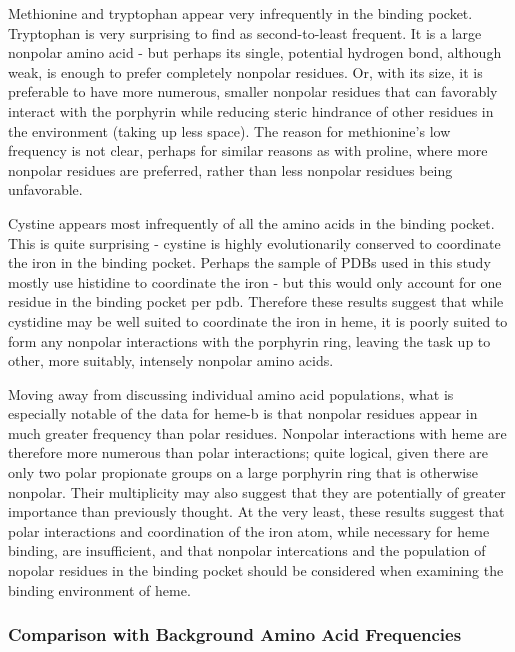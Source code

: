 \documentclass[a4paper, nobind]{templates/ociamthesis}
\begin{document}
Methionine and tryptophan appear very infrequently in the binding pocket. Tryptophan is very surprising to find as second-to-least frequent. It is a large nonpolar amino acid - but perhaps its single, potential hydrogen bond, although weak, is enough to prefer completely nonpolar residues. Or, with its size, it is preferable to have more numerous, smaller nonpolar residues that can favorably interact with the porphyrin while reducing steric hindrance of other residues in the environment (taking up less space). The reason for methionine's low frequency is not clear, perhaps for similar reasons as with proline, where more nonpolar residues are preferred, rather than less nonpolar residues being unfavorable.

Cystine appears most infrequently of all the amino acids in the binding pocket. This is quite surprising - cystine is highly evolutionarily conserved to coordinate the iron in the binding pocket. Perhaps the sample of PDBs used in this study mostly use histidine to coordinate the iron - but this would only account for one residue in the binding pocket per pdb. Therefore these results suggest that while cystidine may be well suited to coordinate the iron in heme, it is poorly suited to form any nonpolar interactions with the porphyrin ring, leaving the task up to other, more suitably, intensely nonpolar amino acids.

Moving away from discussing individual amino acid populations, what is especially notable of the data for heme-b is that nonpolar residues appear in much greater frequency than polar residues. Nonpolar interactions with heme are therefore more numerous than polar interactions; quite logical, given there are only two polar propionate groups on a large porphyrin ring that is otherwise nonpolar. Their multiplicity may also suggest that they are potentially of greater importance than previously thought. At the very least, these results suggest that polar interactions and coordination of the iron atom, while necessary for heme binding, are insufficient, and that nonpolar intercations and the population of nopolar residues in the binding pocket should be considered when examining the binding environment of heme.

\hypertarget{comparison-with-background-amino-acid-frequencies}{%
\subsubsection{Comparison with Background Amino Acid Frequencies}\label{comparison-with-background-amino-acid-frequencies}}
\end{document}
